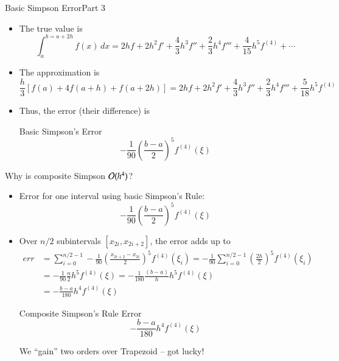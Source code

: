 \documentclass[10pt]{beamer}
\begin{document}
\begin{frame}{Basic Simpson Error}{Part 3}
\begin{itemize}
    \item The true value is 
        \begin{equation*}
        \int_{a}^{b=a+2h}f(x)\,dx = 2hf +2h^2f' + \frac{4}{3}h^3f''+\frac{2}{3}h^4f'''+\frac{4}{15}h^5f^{(4)} + \cdots
        \end{equation*}
    \item The approximation is
        \begin{equation*}
        \frac{h}{3}\left[f(a)+4f(a+h)+f(a+2h)\right] = 2hf +2h^2f' + \frac{4}{3}h^3f''+\frac{2}{3}h^4f'''+\frac{5}{18}h^5f^{(4)}
        \end{equation*}
    \item Thus, the error (their difference) is
    \begin{block}{Basic Simpson's Error}
    \begin{equation*}
    -\frac{1}{90}\left(\frac{b-a}{2}\right)^5 f^{(4)}(\xi)
    \end{equation*}
    \end{block}
\end{itemize}
\end{frame}
\begin{frame}{Why is composite Simpson ${\mathcal{O}}(h^4)$?}
\begin{itemize}
    \item Error for one interval using basic Simpson's Rule:
        \begin{equation*}
        -\frac{1}{90}\left(\frac{b-a}{2}\right)^5 f^{(4)}(\xi)
        \end{equation*}
    \item Over $n/2$ subintervals $[x_{2i},x_{2i+2}]$, the error adds up to
\begin{align*}
err & =  \sum_{i=0}^{n/2-1} -\frac{1}{90}\left(\frac{x_{2i+2}-x_{2i}}{2}\right)^5 f^{(4)}(\xi_i)
      = -\frac{1}{90}  \sum_{i=0}^{n/2-1} \left(\frac{2h}{2}\right)^5 f^{(4)}(\xi_i)\\
    & = -\frac{1}{90}  \frac{n}{2}h^5 f^{(4)}(\xi)
      = -\frac{1}{180} \frac{(b-a)}{h}h^5 f^{(4)}(\xi)\\
    & = -\frac{b-a}{180} h^4 f^{(4)}(\xi)
\end{align*}
\vspace{-0.5cm}

\begin{block}{Composite Simpson's Rule Error}
\begin{equation*}
  -\frac{b-a}{180}h^4 f^{(4)}(\xi)
\end{equation*}
\end{block}
We ``gain'' two orders over Trapezoid -- got lucky!
\end{itemize}
\end{frame}
\end{document}
